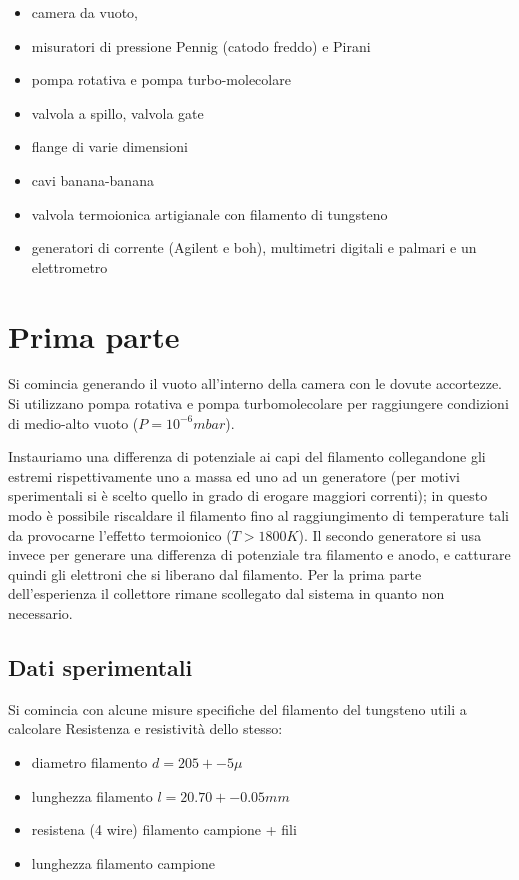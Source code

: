 \documentclass[11pt,a4paper]{article}
\begin{document}
\begin{itemize}
\item camera da vuoto, 
\item misuratori di pressione Pennig (catodo freddo) e Pirani
\item pompa rotativa e pompa turbo-molecolare
\item valvola a spillo, valvola gate
\item flange di varie dimensioni
\item cavi banana-banana
\item valvola termoionica artigianale con filamento di tungsteno
\item generatori di corrente (Agilent e boh), multimetri digitali e palmari e un elettrometro
\end{itemize} 


\section{Prima parte}
Si comincia generando il vuoto all'interno della camera con le dovute accortezze. Si utilizzano pompa rotativa e pompa turbomolecolare per raggiungere condizioni di medio-alto vuoto ($P=10^{-6} mbar$).

Instauriamo una differenza di potenziale ai capi del filamento collegandone gli estremi rispettivamente uno a massa ed uno ad un generatore (per motivi sperimentali si è scelto quello in grado di erogare maggiori correnti); in questo modo è possibile riscaldare il filamento fino al raggiungimento di temperature tali da provocarne l'effetto termoionico (${T>1800 K}$). Il secondo generatore si usa invece per generare una differenza di potenziale tra filamento e anodo, e catturare quindi gli elettroni che si liberano dal filamento. Per la prima parte dell'esperienza il collettore rimane scollegato dal sistema in quanto non necessario.

\subsection{Dati sperimentali}

Si comincia con alcune misure specifiche del filamento del tungsteno utili a calcolare Resistenza e resistività dello stesso:
\begin{itemize}
\item diametro filamento ${d=205+-5\mu}$ 
\item lunghezza filamento ${l=20.70+-0.05mm}$
\item resistena (4 wire) filamento campione + fili ${}$
\item lunghezza filamento campione ${}$
\end{itemize}
\end{document}
